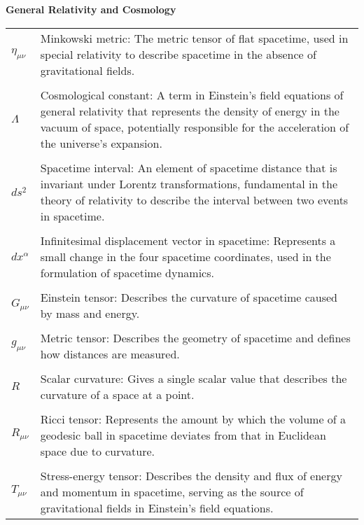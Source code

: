 \documentclass[main.tex]{subfiles}
\begin{document}
\textbf{General Relativity and Cosmology}
\begin{longtable}{p{} p{}}
    $\eta_{\mu \nu}$ & Minkowski metric: The metric tensor of flat spacetime, used in special relativity to describe spacetime in the absence of gravitational fields. \\\\
    $\Lambda$ & Cosmological constant: A term in Einstein's field equations of general relativity that represents the density of energy in the vacuum of space, potentially responsible for the acceleration of the universe's expansion. \\\\
    $ds^2$ & Spacetime interval: An element of spacetime distance that is invariant under Lorentz transformations, fundamental in the theory of relativity to describe the interval between two events in spacetime. \\\\
    $dx^\alpha$ & Infinitesimal displacement vector in spacetime: Represents a small change in the four spacetime coordinates, used in the formulation of spacetime dynamics. \\\\
    $G_{\mu \nu}$ & Einstein tensor: Describes the curvature of spacetime caused by mass and energy. \\\\
    $g_{\mu \nu}$ & Metric tensor: Describes the geometry of spacetime and defines how distances are measured. \\\\
    $R$ & Scalar curvature: Gives a single scalar value that describes the curvature of a space at a point. \\\\
    $R_{\mu \nu}$ & Ricci tensor: Represents the amount by which the volume of a geodesic ball in spacetime deviates from that in Euclidean space due to curvature. \\\\
    $T_{\mu \nu}$ & Stress-energy tensor: Describes the density and flux of energy and momentum in spacetime, serving as the source of gravitational fields in Einstein's field equations.
\end{longtable}
\end{document}
